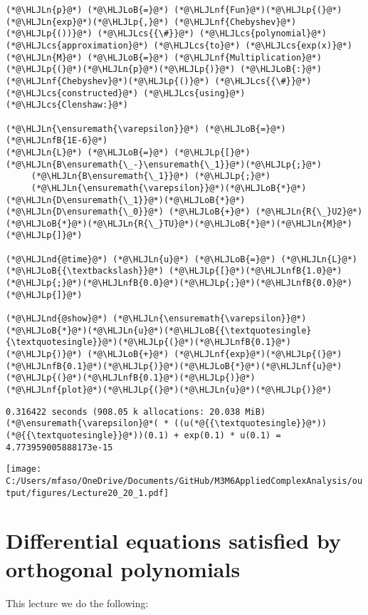 \documentclass[12pt,a4paper]{article}
\newcommand{\HLJLn}[1]{#1}
\newcommand{\HLJLnd}[1]{\textcolor[RGB]{214,102,97}{#1}}
\newcommand{\HLJLnf}[1]{\textcolor[RGB]{66,102,213}{#1}}
\newcommand{\HLJLnfB}[1]{\textcolor[RGB]{59,151,46}{#1}}
\newcommand{\HLJLoB}[1]{\textcolor[RGB]{102,102,102}{\textbf{#1}}}
\newcommand{\HLJLp}[1]{#1}
\newcommand{\HLJLcs}[1]{\textcolor[RGB]{153,153,119}{\textit{#1}}}
\begin{document}
\begin{lstlisting}
(*@\HLJLn{p}@*) (*@\HLJLoB{=}@*) (*@\HLJLnf{Fun}@*)(*@\HLJLp{(}@*)(*@\HLJLn{exp}@*)(*@\HLJLp{,}@*) (*@\HLJLnf{Chebyshev}@*)(*@\HLJLp{())}@*) (*@\HLJLcs{{\#}}@*) (*@\HLJLcs{polynomial}@*) (*@\HLJLcs{approximation}@*) (*@\HLJLcs{to}@*) (*@\HLJLcs{exp(x)}@*)
(*@\HLJLn{M}@*) (*@\HLJLoB{=}@*) (*@\HLJLnf{Multiplication}@*)(*@\HLJLp{(}@*)(*@\HLJLn{p}@*)(*@\HLJLp{)}@*) (*@\HLJLoB{:}@*) (*@\HLJLnf{Chebyshev}@*)(*@\HLJLp{()}@*) (*@\HLJLcs{{\#}}@*) (*@\HLJLcs{constructed}@*) (*@\HLJLcs{using}@*) (*@\HLJLcs{Clenshaw:}@*)

(*@\HLJLn{\ensuremath{\varepsilon}}@*) (*@\HLJLoB{=}@*) (*@\HLJLnfB{1E-6}@*)
(*@\HLJLn{L}@*) (*@\HLJLoB{=}@*) (*@\HLJLp{[}@*)(*@\HLJLn{B\ensuremath{\_-}\ensuremath{\_1}}@*)(*@\HLJLp{;}@*)
     (*@\HLJLn{B\ensuremath{\_1}}@*) (*@\HLJLp{;}@*)
     (*@\HLJLn{\ensuremath{\varepsilon}}@*)(*@\HLJLoB{*}@*)(*@\HLJLn{D\ensuremath{\_1}}@*)(*@\HLJLoB{*}@*)(*@\HLJLn{D\ensuremath{\_0}}@*) (*@\HLJLoB{+}@*) (*@\HLJLn{R{\_}U2}@*)(*@\HLJLoB{*}@*)(*@\HLJLn{R{\_}TU}@*)(*@\HLJLoB{*}@*)(*@\HLJLn{M}@*)(*@\HLJLp{]}@*)

(*@\HLJLnd{@time}@*) (*@\HLJLn{u}@*) (*@\HLJLoB{=}@*) (*@\HLJLn{L}@*) (*@\HLJLoB{{\textbackslash}}@*) (*@\HLJLp{[}@*)(*@\HLJLnfB{1.0}@*)(*@\HLJLp{;}@*)(*@\HLJLnfB{0.0}@*)(*@\HLJLp{;}@*)(*@\HLJLnfB{0.0}@*)(*@\HLJLp{]}@*)

(*@\HLJLnd{@show}@*) (*@\HLJLn{\ensuremath{\varepsilon}}@*)(*@\HLJLoB{*}@*)(*@\HLJLn{u}@*)(*@\HLJLoB{{\textquotesingle}{\textquotesingle}}@*)(*@\HLJLp{(}@*)(*@\HLJLnfB{0.1}@*)(*@\HLJLp{)}@*) (*@\HLJLoB{+}@*) (*@\HLJLnf{exp}@*)(*@\HLJLp{(}@*)(*@\HLJLnfB{0.1}@*)(*@\HLJLp{)}@*)(*@\HLJLoB{*}@*)(*@\HLJLnf{u}@*)(*@\HLJLp{(}@*)(*@\HLJLnfB{0.1}@*)(*@\HLJLp{)}@*)
(*@\HLJLnf{plot}@*)(*@\HLJLp{(}@*)(*@\HLJLn{u}@*)(*@\HLJLp{)}@*)
\end{lstlisting}

\begin{lstlisting}
0.316422 seconds (908.05 k allocations: 20.038 MiB)
(*@\ensuremath{\varepsilon}@*( * ((u(*@{{\textquotesingle}}@*))(*@{{\textquotesingle}}@*))(0.1) + exp(0.1) * u(0.1) = 4.773959005888173e-15
\end{lstlisting}

\texttt{[image: C:/Users/mfaso/OneDrive/Documents/GitHub/M3M6AppliedComplexAnalysis/output/figures/Lecture20\_20\_1.pdf]}

\section{Differential equations satisfied by orthogonal polynomials}
This lecture we do the following:
\end{document}
